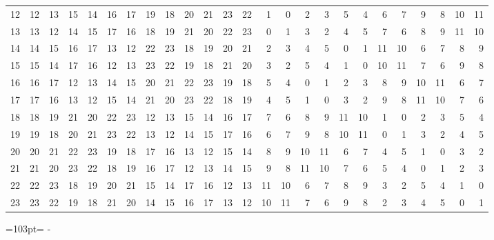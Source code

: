 \documentclass[10pt,a4paper]{article}
\newcommand{\needspace}[1]{\par\penalty-100\begingroup\dimen0=#1\relax\dimen2=\pagegoal
  \advance\dimen2-\pagetotal\ifdim\dimen0>\dimen2\relax\ifdim\dimen2>0pt\vfil\break\fi\fi
  \endgroup}
\numberwithin{equation}{section}
\begin{document}
{\begin{longtable}{@{}r|rrrrrrrrrrrrrrrrrrrrrrrr@{}}
12 & 12 & 13 & 15 & 14 & 16 & 17 & 19 & 18 & 20 & 21 & 23 & 22 & 1 & 0 & 2 & 3 & 5 & 4 & 6 & 7 & 9 & 8 & 10 & 11\\
13 & 13 & 12 & 14 & 15 & 17 & 16 & 18 & 19 & 21 & 20 & 22 & 23 & 0 & 1 & 3 & 2 & 4 & 5 & 7 & 6 & 8 & 9 & 11 & 10\\
14 & 14 & 15 & 16 & 17 & 13 & 12 & 22 & 23 & 18 & 19 & 20 & 21 & 2 & 3 & 4 & 5 & 0 & 1 & 11 & 10 & 6 & 7 & 8 & 9\\
15 & 15 & 14 & 17 & 16 & 12 & 13 & 23 & 22 & 19 & 18 & 21 & 20 & 3 & 2 & 5 & 4 & 1 & 0 & 10 & 11 & 7 & 6 & 9 & 8\\
16 & 16 & 17 & 12 & 13 & 14 & 15 & 20 & 21 & 22 & 23 & 19 & 18 & 5 & 4 & 0 & 1 & 2 & 3 & 8 & 9 & 10 & 11 & 6 & 7\\
17 & 17 & 16 & 13 & 12 & 15 & 14 & 21 & 20 & 23 & 22 & 18 & 19 & 4 & 5 & 1 & 0 & 3 & 2 & 9 & 8 & 11 & 10 & 7 & 6\\
18 & 18 & 19 & 21 & 20 & 22 & 23 & 12 & 13 & 15 & 14 & 16 & 17 & 7 & 6 & 8 & 9 & 11 & 10 & 1 & 0 & 2 & 3 & 5 & 4\\
19 & 19 & 18 & 20 & 21 & 23 & 22 & 13 & 12 & 14 & 15 & 17 & 16 & 6 & 7 & 9 & 8 & 10 & 11 & 0 & 1 & 3 & 2 & 4 & 5\\
20 & 20 & 21 & 22 & 23 & 19 & 18 & 17 & 16 & 13 & 12 & 15 & 14 & 8 & 9 & 10 & 11 & 6 & 7 & 4 & 5 & 1 & 0 & 3 & 2\\
21 & 21 & 20 & 23 & 22 & 18 & 19 & 16 & 17 & 12 & 13 & 14 & 15 & 9 & 8 & 11 & 10 & 7 & 6 & 5 & 4 & 0 & 1 & 2 & 3\\
22 & 22 & 23 & 18 & 19 & 20 & 21 & 15 & 14 & 17 & 16 & 12 & 13 & 11 & 10 & 6 & 7 & 8 & 9 & 3 & 2 & 5 & 4 & 1 & 0\\*
23 & 23 & 22 & 19 & 18 & 21 & 20 & 14 & 15 & 16 & 17 & 13 & 12 & 10 & 11 & 7 & 6 & 9 & 8 & 2 & 3 & 4 & 5 & 0 & 1\\
\bottomrule\end{longtable}}
\needspace{103pt}
\end{document}
